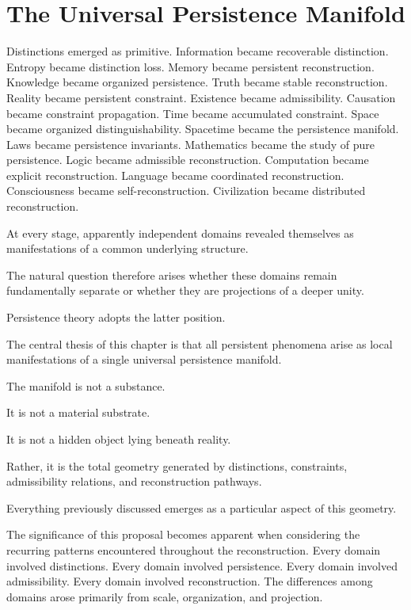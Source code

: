 \documentclass[12pt,oneside]{article}
\theoremstyle{definition}
\begin{document}
\section{The Universal Persistence Manifold}

Distinctions emerged as primitive. Information became recoverable distinction. Entropy became distinction loss. Memory became persistent reconstruction. Knowledge became organized persistence. Truth became stable reconstruction. Reality became persistent constraint. Existence became admissibility. Causation became constraint propagation. Time became accumulated constraint. Space became organized distinguishability. Spacetime became the persistence manifold. Laws became persistence invariants. Mathematics became the study of pure persistence. Logic became admissible reconstruction. Computation became explicit reconstruction. Language became coordinated reconstruction. Consciousness became self-reconstruction. Civilization became distributed reconstruction.

At every stage, apparently independent domains revealed themselves as manifestations of a common underlying structure.

The natural question therefore arises whether these domains remain fundamentally separate or whether they are projections of a deeper unity.

Persistence theory adopts the latter position.

The central thesis of this chapter is that all persistent phenomena arise as local manifestations of a single universal persistence manifold.

The manifold is not a substance.

It is not a material substrate.

It is not a hidden object lying beneath reality.

Rather, it is the total geometry generated by distinctions, constraints, admissibility relations, and reconstruction pathways.

Everything previously discussed emerges as a particular aspect of this geometry.

The significance of this proposal becomes apparent when considering the recurring patterns encountered throughout the reconstruction. Every domain involved distinctions. Every domain involved persistence. Every domain involved admissibility. Every domain involved reconstruction. The differences among domains arose primarily from scale, organization, and projection.
\end{document}
